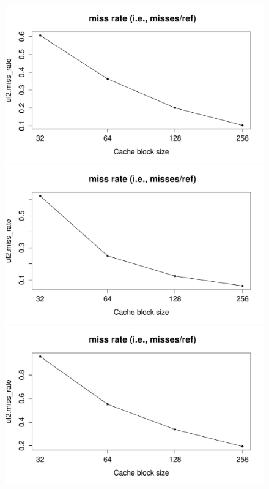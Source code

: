 \documentclass[10pt]{scrartcl}
\begin{document}
\begin{figure}[!htb]
  \includegraphics[trim={1cm 1.2cm 0 1.8cm},clip,width=\linewidth]{NewPlots/plot_BS_miss-rate}
\endminipage\hfill
{}
  \includegraphics[trim={1cm 1.2cm 0 1.8cm},clip,width=\linewidth]{NewPlots/plot_BS_A_miss-rate}
\endminipage\hfill
{}%
  \includegraphics[trim={1cm 1.2cm 0 1.8cm},clip,width=\linewidth]{NewPlots/plot_BS_C_miss-rate}

\end{figure}
\end{document}
